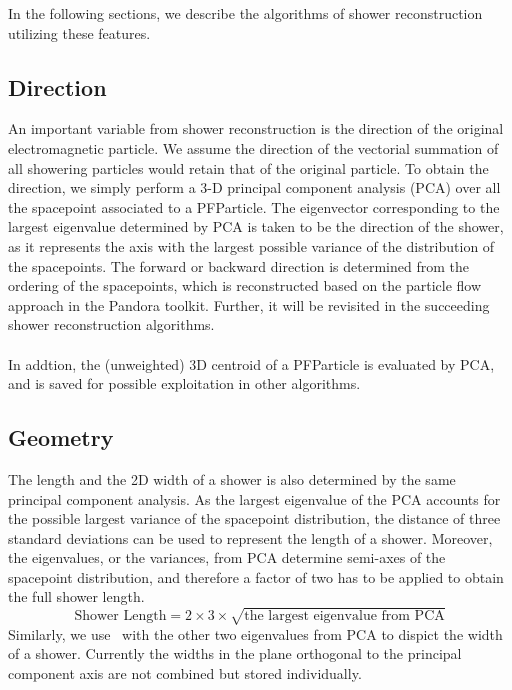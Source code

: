 In the following sections, we describe the algorithms of shower reconstruction 
utilizing these features.

\subsection{Direction}
\label{sec:shrdir}

An important variable from shower reconstruction is the direction of the 
original electromagnetic particle.
We assume the direction of the vectorial summation of all showering particles 
would retain that of the original particle.
To obtain the direction,
we simply perform a 3-D principal component 
analysis (PCA) over all the spacepoint associated to a PFParticle.
The eigenvector corresponding to the largest eigenvalue determined by
PCA is taken to be the direction of the shower, as it represents the axis
with the largest possible variance of the distribution of the spacepoints.
The forward or backward direction is determined from the ordering of
the spacepoints, which is reconstructed based on the particle flow approach in
the Pandora toolkit.
Further, it will be revisited in the succeeding
shower reconstruction algorithms.\\
\\
In addtion, the (unweighted) 3D centroid of a PFParticle is evaluated
by PCA, and is saved for possible exploitation in other algorithms.

\subsection{Geometry}
\label{sec:shrgeo}

The length and the 2D width of a shower is also determined by the same
principal component analysis.
As the largest eigenvalue of the PCA accounts for the possible largest
variance of the spacepoint distribution, the distance of three
standard deviations can be used to represent the length of a shower.
Moreover, the eigenvalues, or the variances, from PCA determine semi-axes
of the spacepoint distribution, and therefore a factor of two has to be
applied to obtain the full shower length.
\begin{equation}
\label{eq:shrlength}
\textrm{Shower Length} = 2\times 3\times \sqrt{\textrm{the largest eigenvalue from PCA}}
\end{equation}
Similarly, we use~ with the other two eigenvalues
from PCA to dispict the width of a shower.
Currently the widths in the plane orthogonal to the principal component
axis are not combined but stored individually.

